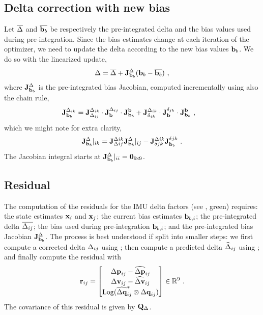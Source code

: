 \subsection{Delta correction with new bias}

Let $\overline{\Delta}$ and $\overline{{\bf b}_b}$ be respectively the pre-integrated delta and the bias values used during pre-integration. Since the bias estimates change at each iteration of the optimizer, we need to update the delta according to the new bias values ${\bf b}_b$. We do so with the linearized update,
%
\begin{align}\label{equ:delta_correction}
\Delta = \overline{\Delta} + {{\bf J}^{\Delta}_{{\bf b}_b}}({\bf b}_b - \overline{{\bf b}_b})
~,
\end{align}
%
where ${{\bf J}^{\Delta}_{{\bf b}_b}}$ is the pre-integrated bias Jacobian, computed incrementally using also the chain rule,
%
\begin{align*}
{{\bf J}^{\Delta_{ik}}_{{\bf b}_b}} 
&= 
{{\bf J}^{\Delta_{ik}}_{\Delta_{ij}}} \cdot {{\bf J}^{\Delta_{ij}}_{{\bf b}}} \cdot {{\bf J}^{{\bf b}}_{{\bf b}_b}} 
+ 
{{\bf J}^{\Delta_{ik}}_{\delta_{jk}}} \cdot {{\bf J}^{\delta_{jk}}_{{\bf b}}} \cdot {{\bf J}^{{\bf b}}_{{\bf b}_b}} 
~,
\end{align*}
%
which we might note for extra clarity,
%
\begin{align}
{{\bf J}^{\Delta}_{{\bf b}_b}}|_{ik} = {{\bf J}^{\Delta ik}_{\Delta ij}}{{\bf J}^{\Delta}_{{\bf b}_b}}|_{ij} - {{\bf J}^{\Delta ik}_{\delta jk}}{{\bf J}^{\delta jk}_{{\bf b}_b}}
~.
\end{align}
%
The Jacobian integral starts at ${{\bf J}^{\Delta}_{{\bf b}_b}}|_{ii} = {\bf0}_{9\!\times\! 9}$.


\subsection{Residual}

The computation of the residuals for the IMU delta factors (see , green) requires: the state estimates ${\bf x}_i$ and ${\bf x}_j$; the current bias estimates ${\bf b}_{b,i}$; the pre-integrated delta $\overline{\Delta_{ij}}$; the bias used during pre-integration $\overline{{\bf b}_{b,i}}$; and the pre-integrated bias Jacobian ${{\bf J}^{\Delta}_{{\bf b}_b}}$. The process is best understood if split into smaller steps: we first compute a corrected delta $\Delta_{ij}$ using ; then compute a predicted delta $\widehat{\Delta}_{ij}$ using ; and finally compute the residual with
%
\begin{align}\label{equ:imu_residual}
{\bf r}_{ij} 
= \begin{bmatrix}
{\Delta{\bf p}}_{ij}-\widehat{{\Delta{\bf p}}}_{ij} \\
{\Delta{\bf v}}_{ij}-\widehat{{\Delta{\bf v}}}_{ij} \\
\operatorname*{Log}(\widehat{{\Delta{\bf q}}}_{ij}^*\otimes{\Delta{\bf q}}_{ij})
\end{bmatrix} 
\in {\mathbb R}^9
~.
\end{align}
%
The covariance of this residual is given by ${\bf Q}_\Delta$.






